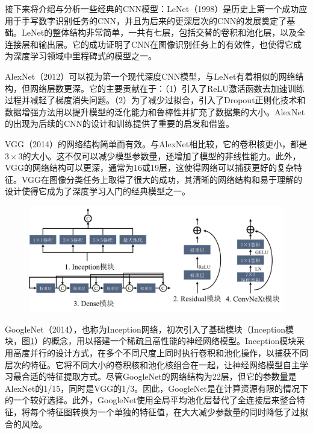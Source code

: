 接下来将介绍与分析一些经典的CNN模型：LeNet\cite{lecun1998gradient}（1998）是历史上第一个成功应用于手写数字识别任务的CNN，并且为后来的更深层次的CNN的发展奠定了基础。LeNet的整体结构非常简单，一共有七层，包括交替的卷积和池化层，以及全连接层和输出层。它的成功证明了CNN在图像识别任务上的有效性，也使得它成为深度学习领域中里程碑式的模型之一。

AlexNet\cite{krizhevsky2012imagenet}（2012）可以视为第一个现代深度CNN模型，与LeNet有着相似的网络结构，但网络层数更深。它的主要贡献在于：（1）引入了ReLU激活函数去加速训练过程并减轻了梯度消失问题。（2）为了减少过拟合，引入了Dropout\cite{srivastava2014dropout}正则化技术和数据增强方法用以提升模型的泛化能力和鲁棒性并扩充了数据集的大小。AlexNet的出现为后续的CNN的设计和训练提供了重要的启发和借鉴。

VGG\cite{Simonyan2014VeryDC}（2014）的网络结构简单而有效。与AlexNet相比较，它的卷积核更小，都是\(3\times3\)的大小。这不仅可以减少模型参数量，还增加了模型的非线性能力。此外，VGG的网络结构可以更深，通常为16或19层，这使得网络可以捕获更好的复杂特征。VGG在图像分类任务上取得了很大的成功，其清晰的网络结构和易于理解的设计使得它成为了深度学习入门的经典模型之一。

\begin{figure}[ht]
  \centering
  \includegraphics[width=\textwidth]{figures/chap02_block.jpg}
  \label{fig:chap02_block}
\end{figure}

GoogleNet\cite{szegedy2015going}（2014），也称为Inception网络，初次引入了基础模块（Inception模块，图\ref{fig:chap02_block}）的概念，用以搭建一个稀疏且高性能的神经网络模型。Inception模块采用高度并行的设计方式，在多个不同尺度上同时执行卷积和池化操作，以捕获不同层次的特征。它将不同大小的卷积核和池化核组合在一起，让神经网络模型自主学习最合适的特征提取方式。尽管GoogleNet的网络结构为22层，但它的参数量是AlexNet的1/15，同时是VGG的1/3。因此，GoogleNet是在计算资源有限的情况下的一个较好选择。此外，GoogleNet使用全局平均池化层替代了全连接层来整合特征，将每个特征图转换为一个单独的特征值，在大大减少参数量的同时降低了过拟合的风险。

